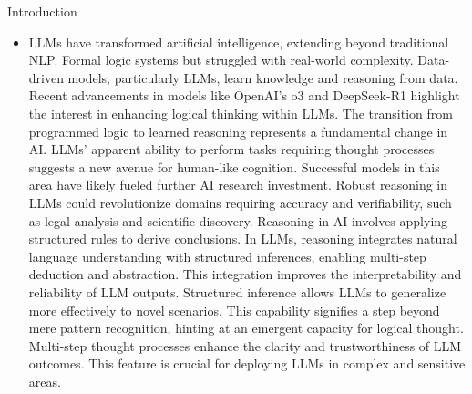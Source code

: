 \begin{frame}{Introduction}
\begin{itemize}
\item LLMs have transformed artificial intelligence, extending beyond traditional NLP.
Formal logic systems but struggled with real-world complexity.
Data-driven models, particularly LLMs, learn knowledge and reasoning from data.
Recent advancements in models like OpenAI's o3 and DeepSeek-R1 highlight the interest in enhancing logical thinking within LLMs.
The transition from programmed logic to learned reasoning represents a fundamental change in AI.
LLMs' apparent ability to perform tasks requiring thought processes suggests a new avenue for human-like cognition.
Successful models in this area have likely fueled further AI research investment.
Robust reasoning in LLMs could revolutionize domains requiring accuracy and verifiability, such as legal analysis and scientific discovery.
Reasoning in AI involves applying structured rules to derive conclusions.
In LLMs, reasoning integrates natural language understanding with structured inferences, enabling multi-step deduction and abstraction.
This integration improves the interpretability and reliability of LLM outputs.
Structured inference allows LLMs to generalize more effectively to novel scenarios.
This capability signifies a step beyond mere pattern recognition, hinting at an emergent capacity for logical thought.
Multi-step thought processes enhance the clarity and trustworthiness of LLM outcomes.
This feature is crucial for deploying LLMs in complex and sensitive areas.

\end{itemize}
\end{frame}